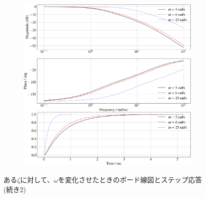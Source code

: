 \begin{figure}
	\centering
	\begin{subfigure}{0.8\linewidth}
		\setcounter{subfigure}{4}
		\centering
		\includegraphics[width=0.8\linewidth]{src/figures/bode-phase-step-ideal-group-zeta/bode-phase-step-ideal-group-zeta-2.0.png}
		\label{fig:bode-phase-step-ideal-group-zeta-2.0}
	\end{subfigure}
	\caption{ある$\zeta$に対して、$\omega$を変化させたときのボード線図とステップ応答(続き2)}
\end{figure}
